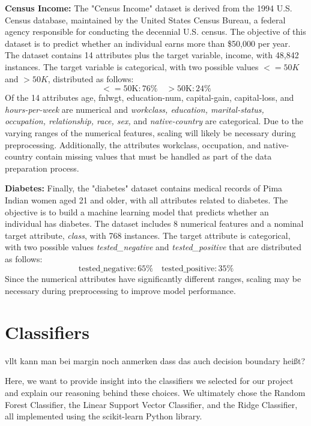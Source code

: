 \documentclass[a4paper,10pt]{article}
\begin{document}
\textbf{Census Income:} The "Census Income" dataset is derived from the 1994 U.S. Census database, maintained by the United States Census Bureau, a federal agency responsible for conducting the decennial U.S. census. The objective of this dataset is to predict whether an individual earns more than \$50,000 per year. The dataset contains 14 attributes plus the target variable, income, with 48,842 instances. The target variable is categorical, with two possible values $<=50K$ and $>50K$, distributed as follows:
\begin{equation*}
    <=\text{50K:}\,76\% \quad >\text{50K:}\,24\%
\end{equation*}        
Of the 14 attributes {age, fnlwgt, education-num, capital-gain, capital-loss,} and \emph{hours-per-week} are numerical and \emph{workclass, education, marital-status, occupation, relationship, race, sex,} and \emph{native-country} are categorical. Due to the varying ranges of the numerical features, scaling will likely be necessary during preprocessing. Additionally, the attributes workclass, occupation, and native-country contain missing values that must be handled as part of the data preparation process.

\textbf{Diabetes:} Finally, the "diabetes" dataset contains medical records of Pima Indian women aged 21 and older, with all attributes related to diabetes. The objective is to build a machine learning model that predicts whether an individual has diabetes. The dataset includes 8 numerical features and a nominal target attribute, \emph{class}, with 768 instances. The target attribute is categorical, with two possible values \emph{tested\_negative} and \emph{tested\_positive} that are distributed as follows:
\begin{equation*}
    \text{tested\_negative:} \,65\% \quad \text{tested\_positive:}\,35\%
\end{equation*} 
Since the numerical attributes have significantly different ranges, scaling may be necessary during preprocessing to improve model performance.

\section{Classifiers}

{\color{red} vllt kann man bei margin noch anmerken dass das auch decision boundary heißt?}

Here, we want to provide insight into the classifiers we selected for our project and explain our reasoning behind these choices. We ultimately chose the Random Forest Classifier, the Linear Support Vector Classifier, and the Ridge Classifier, all implemented using the scikit-learn Python library.
\end{document}
